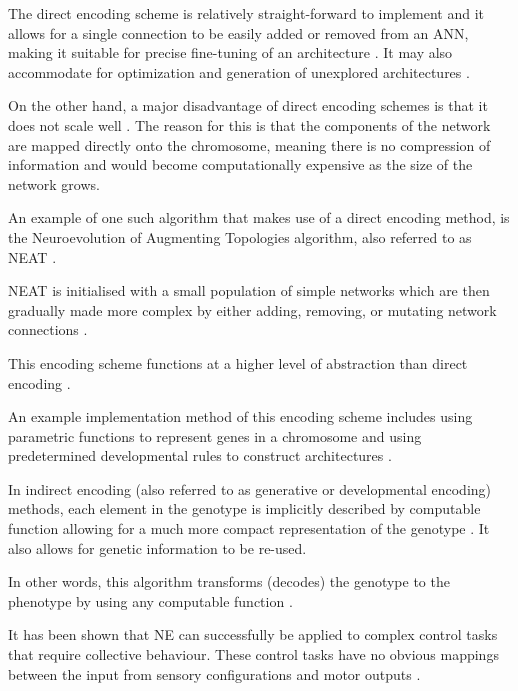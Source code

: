The direct encoding scheme is relatively straight-forward to implement and it allows for a single connection to be easily added or removed from an ANN, making it suitable for precise fine-tuning of an architecture \cite{StanleyMiikkulainen2002}.
It may also accommodate for optimization and generation of unexplored architectures \cite{miller1989designing}.

On the other hand, a major disadvantage of direct encoding schemes is that it does not scale well \cite{XinYao1999}.  The reason for this is that the components of the network are mapped directly onto the chromosome, meaning there is no compression of information and would become computationally expensive as the size of the network grows.

An example of one such algorithm that makes use of a direct encoding method, is the Neuroevolution of Augmenting Topologies algorithm, also referred to as NEAT \cite{Gomez2003}.

NEAT is initialised with a small population of simple networks which are then gradually made more complex by either adding, removing, or mutating network connections \cite{RefWorks:11, Gomez2003}.



This encoding scheme functions at a higher level of abstraction than direct encoding  \cite{Gomez2003}.

An example implementation method of this encoding scheme includes using parametric functions to represent genes in a chromosome and using predetermined developmental rules to construct architectures \cite{koutnik2010evolving}.

In indirect encoding (also referred to as generative or developmental encoding) methods, each element in the genotype is implicitly described by computable function allowing for a much more compact representation of the genotype \cite{clune2011performance, stanley2009hypercube}. It also allows for genetic information to be re-used.

In other words, this algorithm transforms (decodes) the genotype to the phenotype by using any computable function \cite{koutnik2010evolving}.


It has been shown that NE can successfully be applied to complex control tasks that require collective behaviour. These control tasks have no obvious mappings between the input from sensory configurations and motor outputs \cite{NitschkeSaEC2012}.







